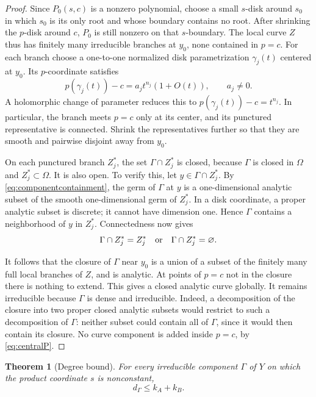 \documentclass[11pt,reqno]{amsart}
\newtheorem{theorem}{Theorem}[section]
\theoremstyle{remark}
\numberwithin{equation}{section}
\begin{document}
\begin{proof}
Since $P_0(s,c)$ is a nonzero polynomial, choose a small $s$-disk
around $s_0$ in which $s_0$ is its only root and whose boundary
contains no root. After shrinking the $p$-disk around $c$, $P_0$
is still nonzero on that $s$-boundary. The local curve $Z$ thus
has finitely many irreducible branches at $y_0$, none contained
in $p=c$. For each branch choose a one-to-one normalized disk
parametrization $\gamma_j(t)$ centered at $y_0$. Its $p$-coordinate
satisfies
\[
 p(\gamma_j(t))-c=a_jt^{n_j}(1+O(t)),\qquad a_j\ne0.
\]
A holomorphic change of parameter reduces this to
$p(\gamma_j(t))-c=t^{n_j}$. In particular, the branch meets
$p=c$ only at its center, and its punctured representative is
connected. Shrink the representatives further so that they are
smooth and pairwise disjoint away from $y_0$.

On each punctured branch $Z_j^*$, the set $\Gamma\cap Z_j^*$
is closed, because $\Gamma$ is closed in $\Omega$ and
$Z_j^*\subset\Omega$. It is also open. To verify this, let
$y\in\Gamma\cap Z_j^*$. By \eqref{eq:componentcontainment},
the germ of $\Gamma$ at $y$ is a one-dimensional analytic subset
of the smooth one-dimensional germ of $Z_j^*$. In a disk
coordinate, a proper analytic subset is discrete; it cannot
have dimension one. Hence $\Gamma$ contains a neighborhood of
$y$ in $Z_j^*$. Connectedness now gives
\[
 \Gamma\cap Z_j^*=Z_j^*\quad\hbox{or}\quad
 \Gamma\cap Z_j^*=\varnothing.
\]

It follows that the closure of $\Gamma$ near $y_0$ is a union of a
subset of the finitely many full local branches of $Z$, and is
analytic. At points of $p=c$ not in the closure there is nothing to
extend. This gives a closed analytic curve globally. It remains
irreducible because $\Gamma$ is dense and irreducible. Indeed, a
decomposition of the closure into two proper closed analytic subsets
would restrict to such a decomposition of $\Gamma$: neither subset
could contain all of $\Gamma$, since it would then contain its
closure. No curve component is added inside
$p=c$, by \eqref{eq:centralP}.
\end{proof}

\begin{theorem}[Degree bound]\label{thm:correspondence}
For every irreducible component $\Gamma$ of $Y$ on which the product
coordinate $s$ is nonconstant,
\[
 d_\Gamma\le k_A+k_B.
\]
\end{theorem}
\end{document}
